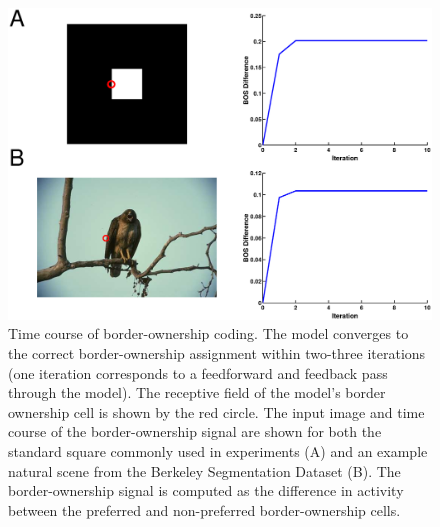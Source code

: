 \documentclass[12pt]{article}
\begin{document}
\begin{figure}[t]
\hfill
\begin{center}
\includegraphics[width=\textwidth]{figs/BOS_timecourse.eps}
\end{center}
\caption{Time course of border-ownership coding. The model converges to the correct border-ownership assignment within two-three iterations (one iteration corresponds to a feedforward and feedback pass through the model). The receptive field of the model's border ownership cell is shown by the red circle. The input image and time course of the border-ownership signal are shown for both the standard square commonly used in experiments (A) and an example natural scene from the Berkeley Segmentation Dataset (B). The border-ownership signal is computed as the difference in activity between the preferred and non-preferred border-ownership cells.}
\label{Fig:results_time}
\end{figure}
\end{document}
